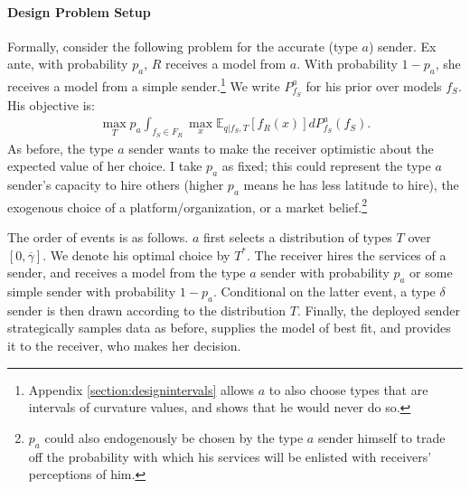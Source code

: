 \documentclass[11pt,dvipsnames]{article}
\begin{document}
\paragraph{Design Problem Setup}
Formally, consider the following problem for the accurate (type $a$) sender.
Ex ante, with probability $p_a$, $R$ receives a model from $a$.
With probability $1-p_a$, she receives a model from a simple sender.\footnote{Appendix \ref{section:designintervals} allows $a$ to also choose types that are intervals of curvature values, and shows that he would never do so.}
We write $P_{f_S}^a$ for his prior over models $f_S$.
His objective is:
\begin{align*}
\max_{T} p_a\int_{f_S \in F_R} \max_{x}\mathbb{E}_{q|f_S,T}[f_R(x)]dP_{f_S}^a(f_S).
\end{align*}
As before, the type $a$ sender wants to make the receiver optimistic about the expected value of her choice.
I take $p_a$ as fixed; this could represent the type $a$ sender's capacity to hire others (higher $p_a$ means he has less latitude to hire), the exogenous choice of a platform/organization, or a market belief.\footnote{$p_a$ could also endogenously be chosen by the type $a$ sender himself to trade off the probability with which his services will be enlisted with receivers' perceptions of him.}


The order of events is as follows.
$a$ first selects a distribution of types $T$ over $[0,\overline{\gamma}]$.
We denote his optimal choice by $T^*$.
The receiver hires the services of a sender, and receives a model from the type $a$ sender with probability $p_a$ or some simple sender with probability $1-p_a$.
Conditional on the latter event, a type $\delta$ sender is then drawn according to the distribution $T$.
Finally, the deployed sender strategically samples data as before, supplies the model of best fit, and provides it to the receiver, who makes her decision.
\end{document}
